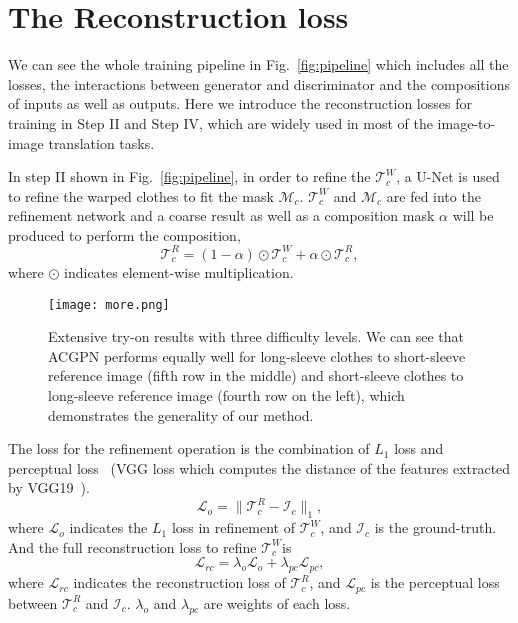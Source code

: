 \documentclass[10pt,twocolumn,letterpaper]{article}
\begin{document}
\thispagestyle{empty}

\section{The Reconstruction loss}
We can see the whole training pipeline in Fig.~\ref{fig:pipeline} which includes all the losses, the interactions between generator and discriminator and the compositions of inputs as well as outputs. Here we introduce the reconstruction losses for training in Step II and Step IV, which are widely used in most of the image-to-image translation tasks.

In step II shown in Fig.~\ref{fig:pipeline}, in order to refine the $\mathcal{T}_c^W$, a U-Net is used to refine the warped clothes to fit the mask $\mathcal{M}_c$. $\mathcal{T}_c^W$ and $\mathcal{M}_c$ are fed into the refinement network and a coarse result as well as a composition mask $\alpha$ will be produced to perform the composition,
\begin{equation}
    \mathcal{T}^{R}_{c}=(1-\alpha)\odot\mathcal{T}^{W}_{c}+\alpha \odot\mathcal{T}^{R}_{c},
\label{refineclothes}
\end{equation}
where $\odot$ indicates element-wise multiplication.

\begin{figure*}[htb]
\begin{center}
\texttt{[image: more.png]}
\end{center}
   \caption{Extensive try-on results with three difficulty levels. We can see that ACGPN performs equally well for long-sleeve clothes to short-sleeve reference image (fifth row in the middle) and short-sleeve clothes to long-sleeve reference image (fourth row on the left), which demonstrates the generality of our method.
}
\label{fig:more}
\end{figure*}


The loss for the refinement operation is the combination of $L_1$ loss and perceptual loss~\cite{JohnsonPerceptual} (\ie VGG loss which computes the distance of the features extracted by VGG19~\cite{Simonyan2014Very}).
\begin{equation}
    \mathcal{L}_{o}=\lVert \mathcal{T}^{R}_{c} \!-\! \mathcal{I}_c \rVert_1,
\end{equation}
where $\mathcal{L}_{o}$ indicates the $L_1$ loss in refinement of $\mathcal{T}^{W}_{c}$, and $\mathcal{I}_c$ is the ground-truth. And the full reconstruction loss to refine $\mathcal{T}^{W}_{c}$is
\begin{equation}
    \mathcal{L}_{rc}=\lambda_o\mathcal{L}_o+\lambda_{pc}\mathcal{L}_{pc},
\end{equation}
where $\mathcal{L} _{rc}$ indicates the reconstruction loss of $\mathcal{T}^{R}_{c}$, and $\mathcal{L}_{pc}$ is the perceptual loss between $\mathcal{T}^{R}_{c}$ and $\mathcal{I}_c$. $\lambda_{o}$ and $\lambda_{pc}$ are weights of each loss.
\end{document}

